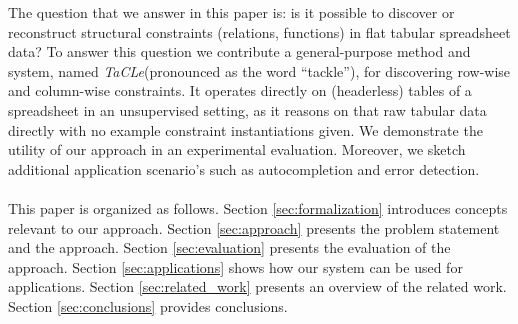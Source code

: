 \documentclass{IEEEtran}
\newcommand{\tias}[1]{\textcolor{blue}{{\sc Tias:} #1}\xspace}
\newcommand{\format}[1]{\textit{#1}\xspace}
\newcommand{\sname}{\format{TaCLe}}
\theoremstyle{definition}
\begin{document}
The question that we answer in this paper is: is it possible to discover or reconstruct structural constraints (relations, functions) in flat tabular spreadsheet data?
To answer this question we contribute a general-purpose method and system, named \sname (pronounced as the word ``tackle''), for discovering row-wise and column-wise constraints.
It operates directly on (headerless) tables of a spreadsheet in an unsupervised setting, as it reasons on that raw tabular data directly with no example constraint instantiations given. %
We demonstrate the utility of our approach in an experimental evaluation.
Moreover, we sketch additional application scenario's such as autocompletion and error detection.
\\\\
This paper is organized as follows.
Section \ref{sec:formalization} introduces concepts relevant to our approach. Section \ref{sec:approach} presents the problem statement and the approach. Section \ref{sec:evaluation} presents the evaluation of the approach. Section \ref{sec:applications} shows how our system can be used for applications. Section \ref{sec:related_work} presents an overview of the related work. Section \ref{sec:conclusions} provides conclusions.


\end{document}

